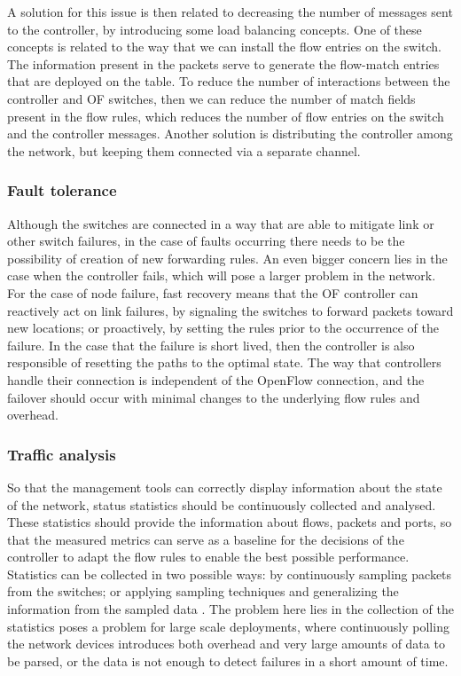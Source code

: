 \begin {enumerate}
\begin{enumerate}
\par A solution for this issue is then related to decreasing the number of messages sent to the controller, by introducing some load balancing concepts. One of
these concepts is related to the way that we can install the flow entries on the switch. The information present in the packets serve to generate the flow-match
entries that are deployed on the table. To reduce the number of interactions between the controller and OF switches, then we can reduce the number of match fields
present in the flow rules, which reduces the number of flow entries on the switch and the controller messages. Another solution is distributing the controller among
the network, but keeping them connected via a separate channel.

\subsubsection {Fault tolerance} \label{sec:fault_tolerance}

Although the switches are connected in a way that are able to mitigate link or other switch failures, in the case of faults occurring there needs to be the
possibility of creation of new forwarding rules. An even bigger concern lies in the case when the controller fails, which will pose a larger problem in the network. 
For the case of node failure, fast recovery means that the OF controller can reactively act on link failures, by signaling the switches to forward packets toward 
new locations; or proactively, by setting the rules prior to the occurrence of the failure. In the case that the failure is short lived, then the controller is also 
responsible of resetting the paths to the optimal state. The way that controllers handle their connection is independent of the OpenFlow connection, and the
failover should occur with minimal changes to the underlying flow rules and overhead.

\subsubsection {Traffic analysis}

So that the management tools can correctly display information about the state of the network, status statistics should be continuously collected and analysed. These
statistics should provide the information about flows, packets and ports, so that the measured metrics can serve as a baseline for the decisions of the controller to
adapt the flow rules to enable the best possible performance. Statistics can be collected in two possible ways: by continuously sampling
packets from the switches; or applying sampling techniques and generalizing the information from the sampled data \cite{curtis_mahout:_2011}. The problem here lies
in the collection of the statistics poses a problem for large scale deployments, where continuously polling the network devices introduces both overhead and very 
large amounts of data to be parsed, or the data is not enough to detect failures in a short amount of time. 


\end{enumerate}
\end{enumerate}

